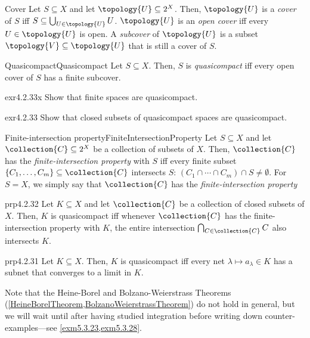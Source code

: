 \begin{dfn}{Cover}{}
Let $S\subseteq X$ and let $\topology{U}\subseteq 2^{X}$.  Then, $\topology{U}$ is a \emph{cover} of $S$ iff $S\subseteq \bigcup _{U\in \topology{U}}U$.  $\topology{U}$ is an \emph{open cover} iff every $U\in \topology{U}$ is open.  A \emph{subcover} of $\topology{U}$ is a subset $\topology{V}\subseteq \topology{U}$ that is still a cover of $S$.
\end{dfn}
\begin{dfn}{Quasicompact}{Quasicompact}
Let $S\subseteq X$.  Then, $S$ is \emph{quasicompact} iff every open cover of $S$ has a finite subcover.
\end{dfn}
\begin{exr}{}{exr4.2.33x}
Show that finite spaces are quasicompact.
\end{exr}
\begin{exr}{}{exr4.2.33}
Show that closed subsets of quasicompact spaces are quasicompact.
\end{exr}
\begin{dfn}{Finite-intersection property}{FiniteIntersectionProperty}
Let $S\subseteq X$ and let $\collection{C}\subseteq 2^X$ be a collection of subsets of $X$.  Then, $\collection{C}$ has the \emph{finite-intersection property} with $S$ iff every finite subset $\{ C_1,\ldots ,C_m\} \subseteq \collection{C}$ intersects $S$:  $(C_1\cap \cdots \cap C_m)\cap S\neq \emptyset$.  For $S=X$, we simply say that $\collection{C}$ has the \emph{finite-intersection property}
\end{dfn}
\begin{prp}{}{prp4.2.32}
Let $K\subseteq X$ and let $\collection{C}$ be a collection of closed subsets of $X$.  Then, $K$ is quasicompact iff whenever $\collection{C}$ has the finite-intersection property with $K$, the entire intersection $\bigcap _{C\in \collection{C}}C$ also intersects $K$.
\end{prp}
\begin{prp}{}{prp4.2.31}
Let $K\subseteq X$.  Then, $K$ is quasicompact iff every net $\lambda \mapsto a_\lambda \in K$ has a subnet that converges to a limit in $K$.
\end{prp}
Note that the Heine-Borel and Bolzano-Weierstrass Theorems (\cref{HeineBorelTheorem,BolzanoWeierstrassTheorem}) do not hold in general, but we will wait until after having studied integration before writing down counter-examples---see \cref{exm5.3.23,exm5.3.28}.

